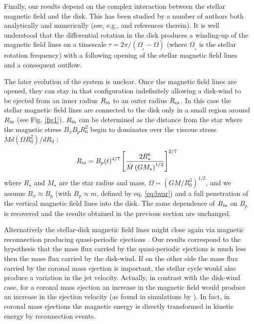 \documentclass{emulateapj}
\begin{document}
Finally, our results depend on the complex
interaction between the stellar magnetic field and the disk.
This has 
been studied by a number of authors both analytically and 
numerically (see, e.g., \citealt{uzd04} and references therein).
It is well understood that the differential rotation 
in the disk produces a winding-up of the magnetic field lines
on a timescale $ \tau = 2 \pi/\left(\Omega_{_\star}-\Omega\right)$
(where $\Omega_{_\star}$ is the stellar rotation frequency)
with a following opening of the stellar magnetic field lines
and a consequent outflow.

The later evolution of the system is unclear.
Once the magnetic field lines are opened, they can stay in that
configuration indefinitely \citep{lov95} allowing a 
disk-wind to be ejected from an inner radius $R_{\rm in}$ to an 
outer radius $R_{\rm ex}$.
In this case the stellar magnetic field lines are connected to the disk
only in a small region around $R_{\rm in}$ (see Fig. \ref{fig1}).
$R_{\rm in}$ can be determined as the distance 
from the star where the magnetic stress $B_{\phi} B_p R_0^2$ begin to dominates over the 
viscous stress $\dot{M} d\left(\Omega R_0^2\right)/dR_0$ \citep[e.g.][]{wan96}:
%
\begin{equation}
  R_{\rm in} = B_p(t)^{4/7} \left[
          \frac{2 R_\star^6}
               {\dot{M}\left(GM_\star\right)^{1/2}} \right]^{2/7}
  \label{eq:rin}
\end{equation}
%
where
$R_\star$ and $M_\star$ are the star radius and mass,
$\Omega=(GM/R_0^3)^{1/2}$, and we assume $B_{\phi} \approx B_p$ 
(with $B_p \propto m$, defined by eq. \ref{eq:bvar}) and a 
full penetration of the vertical magnetic field lines into the disk.
The same dependence of $R_{\rm in}$ on $B_p$ is 
recovered and the results obtained in the previous section are unchanged.

Alternatively the stellar-disk magnetic field lines
might close again via magnetic reconnection
producing quasi-periodic ejections
\citep[e.g.][]{goo99,mat02}.
Our results correspond to the hypothesis
that the mass flux carried by the quasi-periodic ejections is much less
then the mass flux carried by the disk-wind.
If on the other side the mass flux carried by the coronal mass ejection is 
important, the stellar cycle would also produce a variation in the jet velocity.
Actually, in contrast with the disk-wind case, for a
coronal mass ejection an increase in the magnetic field would produce 
an increase in the ejection velocity (as found in simulations
by \citealt{mat02}). In fact, in coronal mass ejections the magnetic energy is 
directly transformed in kinetic energy by reconnection events.
\end{document}
